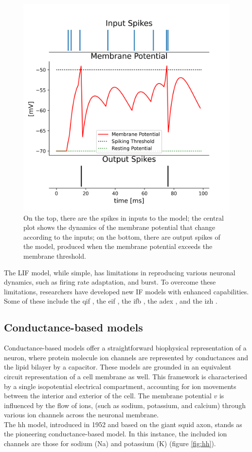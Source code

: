 \begin{figure}[hbt!]
    \begin{center}
    \includegraphics[width=0.8\linewidth]{img/LLLif1.png}
    \end{center}
    \caption[LIF model functioning]{On the top, there are the spikes in inputs to the model; the central plot shows the dynamics of the membrane potential that change according to the inputs; on the bottom, there are output spikes of the model, produced when the membrane potential exceeds the membrane threshold.}
    \label{fig:lif}
\end{figure}

The LIF model, while simple, has limitations in reproducing various neuronal dynamics, such as firing rate adaptation, and burst. To overcome these limitations, researchers have developed new IF models with enhanced capabilities. Some of these include the \acrfull{qif} \cite{Zheng}, the \acrfull{eif} \cite{FourcaudTrocme}, the \acrfull{ifb} \cite{Smith}, the \acrfull{adex} \cite{Brette}, and the \acrfull{izh} \cite{IZH}.\\

\subsection{Conductance-based models}
Conductance-based models \cite{Hendrickson} offer a straightforward biophysical representation of a neuron, where protein molecule ion channels are represented by conductances and the lipid bilayer by a capacitor. These models are grounded in an equivalent circuit representation of a cell membrane as well. This framework is characterised by a single isopotential electrical compartment, accounting for ion movements between the interior and exterior of the cell. The membrane potential $v$ is influenced by the flow of ions, (such as sodium, potassium, and calcium) through various ion channels across the neuronal membrane.\\
The \acrfull{hh} model, introduced in 1952 \cite{HH} and based on the giant squid axon, stands as the pioneering conductance-based model. In this instance, the included ion channels are those for sodium (Na) and potassium (K) (figure \ref{fig:hh}).\\
    

